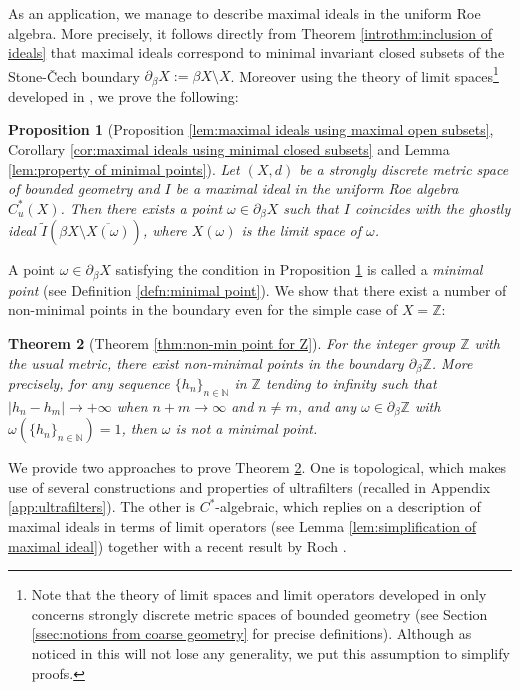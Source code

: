 \documentclass[12pt, a4paper]{amsart}
\numberwithin{equation}{section}
\newtheorem{alphthm}{Theorem}			%
\newtheorem{alphprop}[alphthm]{Proposition}
\theoremstyle{definition}
\theoremstyle{remark}
\def\NN{\mathbb{N}}
\def\ZZ{\mathbb{Z}}
\begin{document}
As an application, we manage to describe maximal ideals in the uniform Roe algebra. More precisely, it follows directly from Theorem \ref{introthm:inclusion of ideals} that maximal ideals correspond to minimal invariant closed subsets of the Stone-\v{C}ech boundary $\partial_\beta X:=\beta X \setminus X$. Moreover using the theory of limit spaces\footnote{Note that the theory of limit spaces and limit operators developed in \cite{SW17} only concerns strongly discrete metric spaces of bounded geometry (see Section \ref{ssec:notions from coarse geometry} for precise definitions). Although as noticed in \cite{SW17} this will not lose any generality, we put this assumption to simplify proofs.} developed in \cite{SW17}, we prove the following:

\begin{alphprop}[Proposition \ref{lem:maximal ideals using maximal open subsets}, Corollary \ref{cor:maximal ideals using minimal closed subsets} and Lemma \ref{lem:property of minimal points}]\label{introprop:maximal ideals}
Let $(X,d)$ be a strongly discrete metric space of bounded geometry and $I$ be a maximal ideal in the uniform Roe algebra $C^*_u(X)$. Then there exists a point $\omega \in \partial_\beta X$ such that $I$ coincides with the ghostly ideal $\tilde{I}(\beta X \setminus \overline{X(\omega)})$, where $X(\omega)$ is the limit space of $\omega$. 
\end{alphprop}

A point $\omega \in \partial_\beta X$ satisfying the condition in Proposition \ref{introprop:maximal ideals} is called a \emph{minimal point} (see Definition \ref{defn:minimal point}). We show that there exist a number of non-minimal points in the boundary even for the simple case of $X=\ZZ$:

\begin{alphthm}[Theorem \ref{thm:non-min point for Z}]\label{introthm:maximal ideals for Z}
For the integer group $\ZZ$ with the usual metric, there exist non-minimal points in the boundary $\partial_\beta \ZZ$. More precisely, for any sequence $\{h_n\}_{n\in \NN}$ in $\ZZ$ tending to infinity such that $|h_n -h_m| \to +\infty$ when $n+m \to \infty$ and $n\neq m$, and any $\omega \in \partial_\beta \ZZ$ with $\omega(\{h_n\}_{n\in \NN})=1$, then $\omega$ is \emph{not} a minimal point.
\end{alphthm}

We provide two approaches to prove Theorem \ref{introthm:maximal ideals for Z}. One is topological, which makes use of several constructions and properties of ultrafilters (recalled in Appendix \ref{app:ultrafilters}). The other is $C^*$-algebraic, which replies on a description of maximal ideals in terms of limit operators (see Lemma \ref{lem:simplification of maximal ideal}) together with a recent result by Roch \cite{Roc22}.
\end{document}

